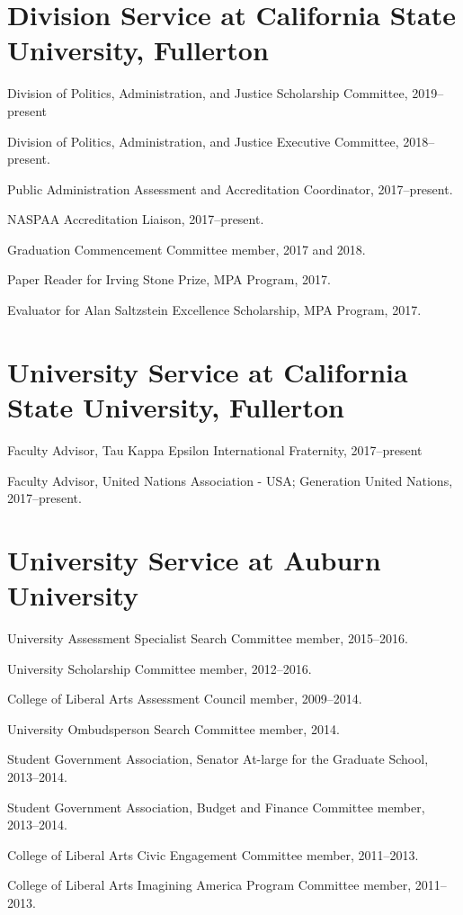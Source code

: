 \documentclass[11pt,letterpaper]{article}
\renewenvironment{itemize}{
  \begin{list}{}{
    \setlength{\leftmargin}{1.5em}
    \setlength{\itemsep}{0.25em}
    \setlength{\parskip}{0pt}
    \setlength{\parsep}{0.25em}
  }
}{
  \end{list}
}
\begin{document}
\section*{Division Service at California State University, Fullerton}
	\begin{itemize}
		\item Division of Politics, Administration, and Justice Scholarship Committee, 2019--present
		\item Division of Politics, Administration, and Justice Executive Committee, 2018--present. 
		\item Public Administration Assessment and Accreditation Coordinator, 2017--present.
		\item NASPAA Accreditation Liaison, 2017--present.
		\item Graduation Commencement Committee member, 2017 and 2018.
		\item Paper Reader for Irving Stone Prize, MPA Program, 2017.
		\item Evaluator for Alan Saltzstein Excellence Scholarship, MPA Program, 2017. 
	\end{itemize}

\section*{University Service at California State University, Fullerton}
	\begin{itemize}
		\item Faculty Advisor, Tau Kappa Epsilon International Fraternity, 2017--present
		\item Faculty Advisor, United Nations Association - USA; Generation United Nations, 2017--present.
	\end{itemize}
	
\section*{University Service at Auburn University}
\begin{itemize}
	\item University Assessment Specialist Search Committee member, 2015--2016.
	\item University Scholarship Committee member, 2012--2016.
	\item College of Liberal Arts Assessment Council member, 2009--2014.
	\item University Ombudsperson Search Committee member, 2014.  
	\item Student Government Association, Senator At-large for the Graduate School, 2013--2014.
	\item Student Government Association, Budget and Finance Committee member, 2013--2014.
	\item College of Liberal Arts Civic Engagement Committee member, 2011--2013.
	\item College of Liberal Arts Imagining America Program Committee member, 2011--2013.
\end{itemize}
\end{document}
